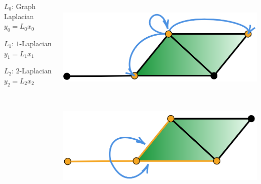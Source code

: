 \documentclass[landscape,a0paper,blockverticalspace = 5mm]{tikzposter}
\begin{document}
\begin{columns}
{{\begin{center}
      \begin{minipage}{0.2\linewidth}
		\begin{center}
		 $L_0$: Graph Laplacian\\
		$y_0=L_0x_0$
	\end{center}		       
      
      \end{minipage}\hspace{4.5cm}
      \begin{minipage}{0.2\linewidth}
         \begin{center}
		  $L_1$: $1$-Laplacian\\
		$y_1=L_1x_1$
	\end{center}
      \end{minipage} \hspace{4.5cm}
	\begin{minipage}{0.2\linewidth}
         \begin{center}
		 $L_2$: $2$-Laplacian\\
		$y_2=L_2x_2$
	\end{center}
      \end{minipage} 
      
      \end{center}
      
\begin{center}
		 \begin{minipage}{0.2\linewidth}
		 \begin{center}
		
          \includegraphics[height=4.8cm]{figures/glap0.png}

          \vspace{1cm}
        
          \end{center}
      \end{minipage} \hspace{3.6cm}
      \begin{minipage}{0.2\linewidth}
      \begin{center}
     	\vspace{1.5cm}
          \includegraphics[height=4.58cm]{figures/glap1.png}
          

\end{center}
\end{minipage}
\end{center}}}
\end{columns}
\end{document}

